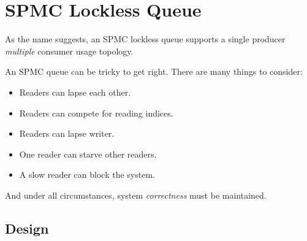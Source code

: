 
% 

\chapter{SPMC Lockless Queue}

As the name suggests, an SPMC lockless queue supports a single producer
\textit{multiple} consumer usage topology.\\


\begin{center}
\end{center}

An SPMC queue can be tricky to get right. There are many things to consider:
\begin{itemize}
    \item Readers can lapse each other.
    \item Readers can compete for reading indices.
    \item Readers can lapse writer.
    \item One reader can starve other readers.
    \item A slow reader can block the system.
\end{itemize}

And under all circumstances, system \textit{correctness} must be maintained.

\section{Design}

